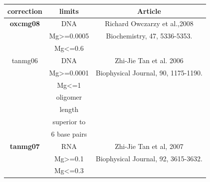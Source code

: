\documentclass{article}
\begin{document}
 \begin{table}[h][c]
\begin{tabular}[h]{| c | c | c |}
\textbf{correction} & \textbf{limits} & \textbf{Article} \\ 
\hline
\textbf{oxcmg08} & DNA & Richard Owczarzy et al.,2008 \\
 & Mg>=0.0005 & Biochemistry, 47, 5336-5353. \\
 & Mg<=0.6 & \\
 \hline
tanmg06 & DNA & Zhi-Jie Tan et al. 2006 \\
 & Mg>=0.0001 & Biophysical Journal, 90, 1175-1190. \\
 & Mg<=1 & \\
 & oligomer & \\
 & length & \\
 & superior to & \\
 & 6 base pairs & \\
 \hline
\textbf{tanmg07} & RNA & Zhi-Jie Tan et al, 2007 \\
 & Mg>=0.1 & Biophysical Journal, 92, 3615-3632. \\
 & Mg<=0.3 & \\
 \hline
\end{tabular}
\end{table}

\pagebreak
\end{document}

